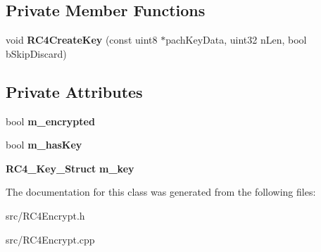 \subsection*{Private Member Functions}
\begin{DoxyCompactItemize}
\item 
void {\bfseries RC4CreateKey} (const uint8 $\ast$pachKeyData, uint32 nLen, bool bSkipDiscard)\label{classCRC4EncryptableBuffer_ac91bb6e3665347c0d2a0b5cc8a21d623}

\end{DoxyCompactItemize}
\subsection*{Private Attributes}
\begin{DoxyCompactItemize}
\item 
bool {\bfseries m\_\-encrypted}\label{classCRC4EncryptableBuffer_a003c019478a89abb541eeb20c31beb9f}

\item 
bool {\bfseries m\_\-hasKey}\label{classCRC4EncryptableBuffer_a89aba35ca70d15b502f9a1553efd4b45}

\item 
{\bf RC4\_\-Key\_\-Struct} {\bfseries m\_\-key}\label{classCRC4EncryptableBuffer_ad4db6627dc6332165e8ee916f0aecd61}

\end{DoxyCompactItemize}


The documentation for this class was generated from the following files:\begin{DoxyCompactItemize}
\item 
src/RC4Encrypt.h\item 
src/RC4Encrypt.cpp\end{DoxyCompactItemize}

